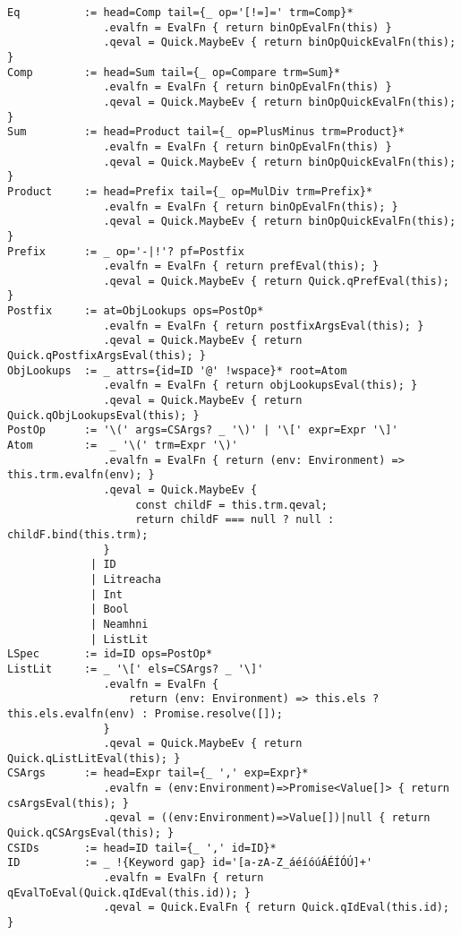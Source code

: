\begin{lstlisting}[language=tspeg, frame=single]
Eq          := head=Comp tail={_ op='[!=]=' trm=Comp}*
               .evalfn = EvalFn { return binOpEvalFn(this) }
               .qeval = Quick.MaybeEv { return binOpQuickEvalFn(this); }
Comp        := head=Sum tail={_ op=Compare trm=Sum}*
               .evalfn = EvalFn { return binOpEvalFn(this) }
               .qeval = Quick.MaybeEv { return binOpQuickEvalFn(this); }
Sum         := head=Product tail={_ op=PlusMinus trm=Product}*
               .evalfn = EvalFn { return binOpEvalFn(this) }
               .qeval = Quick.MaybeEv { return binOpQuickEvalFn(this); }
Product     := head=Prefix tail={_ op=MulDiv trm=Prefix}*
               .evalfn = EvalFn { return binOpEvalFn(this); }
               .qeval = Quick.MaybeEv { return binOpQuickEvalFn(this); }
Prefix      := _ op='-|!'? pf=Postfix
               .evalfn = EvalFn { return prefEval(this); }
               .qeval = Quick.MaybeEv { return Quick.qPrefEval(this); }
Postfix     := at=ObjLookups ops=PostOp*
               .evalfn = EvalFn { return postfixArgsEval(this); }
               .qeval = Quick.MaybeEv { return Quick.qPostfixArgsEval(this); }
ObjLookups  := _ attrs={id=ID '@' !wspace}* root=Atom
               .evalfn = EvalFn { return objLookupsEval(this); }
               .qeval = Quick.MaybeEv { return Quick.qObjLookupsEval(this); }
PostOp      := '\(' args=CSArgs? _ '\)' | '\[' expr=Expr '\]'
Atom        :=  _ '\(' trm=Expr '\)'
               .evalfn = EvalFn { return (env: Environment) => this.trm.evalfn(env); }
               .qeval = Quick.MaybeEv {
                    const childF = this.trm.qeval;
                    return childF === null ? null : childF.bind(this.trm);
               }
             | ID
             | Litreacha
             | Int
             | Bool
             | Neamhni
             | ListLit
LSpec       := id=ID ops=PostOp*
ListLit     := _ '\[' els=CSArgs? _ '\]'
               .evalfn = EvalFn {
                   return (env: Environment) => this.els ? this.els.evalfn(env) : Promise.resolve([]);
               }
               .qeval = Quick.MaybeEv { return Quick.qListLitEval(this); }
CSArgs      := head=Expr tail={_ ',' exp=Expr}*
               .evalfn = (env:Environment)=>Promise<Value[]> { return csArgsEval(this); }
               .qeval = ((env:Environment)=>Value[])|null { return Quick.qCSArgsEval(this); }
CSIDs       := head=ID tail={_ ',' id=ID}*
ID          := _ !{Keyword gap} id='[a-zA-Z_áéíóúÁÉÍÓÚ]+'
               .evalfn = EvalFn { return qEvalToEval(Quick.qIdEval(this.id)); }
               .qeval = Quick.EvalFn { return Quick.qIdEval(this.id); }

\end{lstlisting}
